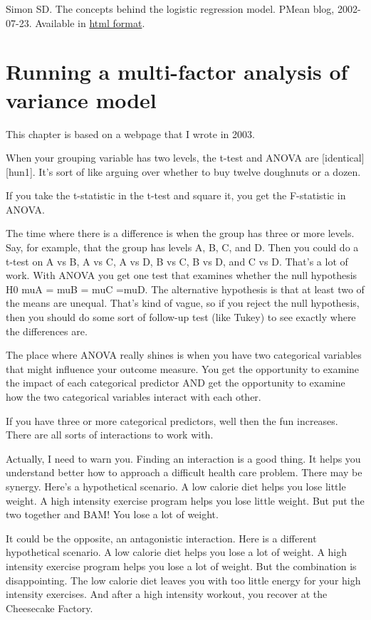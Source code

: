 \documentclass[
  letterpaper,
  DIV=11,
  numbers=noendperiod]{scrreprt}
\begin{document}
\begin{tcolorbox}
Simon SD. The concepts behind the logistic regression model. PMean blog,
2002-07-23. Available in
\href{http://pmean.com/posts/logistic-regression-concepts/}{html
format}.


\chapter{Running a multi-factor analysis of variance
model}\label{running-a-multi-factor-analysis-of-variance-model}

This chapter is based on a webpage that I wrote in 2003.

When your grouping variable has two levels, the t-test and ANOVA are
{[}identical{]}{[}hun1{]}. It's sort of like arguing over whether to buy
twelve doughnuts or a dozen.

If you take the t-statistic in the t-test and square it, you get the
F-statistic in ANOVA.

The time where there is a difference is when the group has three or more
levels. Say, for example, that the group has levels A, B, C, and D. Then
you could do a t-test on A vs B, A vs C, A vs D, B vs C, B vs D, and C
vs D. That's a lot of work. With ANOVA you get one test that examines
whether the null hypothesis H0 muA = muB = muC =muD. The alternative
hypothesis is that at least two of the means are unequal. That's kind of
vague, so if you reject the null hypothesis, then you should do some
sort of follow-up test (like Tukey) to see exactly where the differences
are.

The place where ANOVA really shines is when you have two categorical
variables that might influence your outcome measure. You get the
opportunity to examine the impact of each categorical predictor AND get
the opportunity to examine how the two categorical variables interact
with each other.

If you have three or more categorical predictors, well then the fun
increases. There are all sorts of interactions to work with.

Actually, I need to warn you. Finding an interaction is a good thing. It
helps you understand better how to approach a difficult health care
problem. There may be synergy. Here's a hypothetical scenario. A low
calorie diet helps you lose little weight. A high intensity exercise
program helps you lose little weight. But put the two together and BAM!
You lose a lot of weight.

It could be the opposite, an antagonistic interaction. Here is a
different hypothetical scenario. A low calorie diet helps you lose a lot
of weight. A high intensity exercise program helps you lose a lot of
weight. But the combination is disappointing. The low calorie diet
leaves you with too little energy for your high intensity exercises. And
after a high intensity workout, you recover at the Cheesecake Factory.


\end{tcolorbox}
\end{document}
